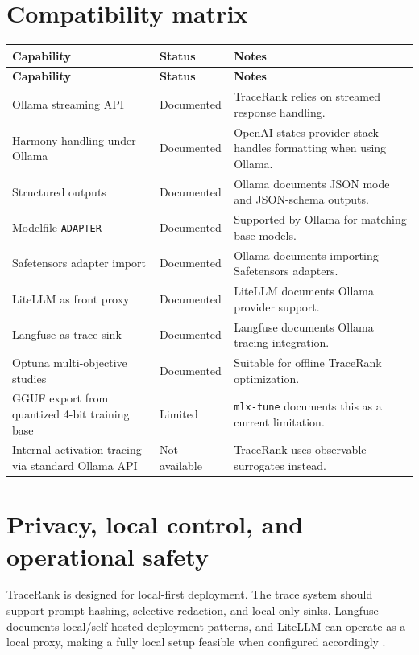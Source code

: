     \section{Compatibility matrix}
    \begin{longtable}{p{4cm}p{3cm}p{7.2cm}}
    \toprule
    \textbf{Capability} & \textbf{Status} & \textbf{Notes} \\
    \midrule
    \endfirsthead
    \toprule
    \textbf{Capability} & \textbf{Status} & \textbf{Notes} \\
    \midrule
    \endhead
    Ollama streaming API & Documented & TraceRank relies on streamed response handling. \\
    Harmony handling under Ollama & Documented & OpenAI states provider stack handles formatting when using Ollama. \\
    Structured outputs & Documented & Ollama documents JSON mode and JSON-schema outputs. \\
    Modelfile \texttt{ADAPTER} & Documented & Supported by Ollama for matching base models. \\
    Safetensors adapter import & Documented & Ollama documents importing Safetensors adapters. \\
    LiteLLM as front proxy & Documented & LiteLLM documents Ollama provider support. \\
    Langfuse as trace sink & Documented & Langfuse documents Ollama tracing integration. \\
    Optuna multi-objective studies & Documented & Suitable for offline TraceRank optimization. \\
    GGUF export from quantized 4-bit training base & Limited & \texttt{mlx-tune} documents this as a current limitation. \\
    Internal activation tracing via standard Ollama API & Not available & TraceRank uses observable surrogates instead. \\
    \bottomrule
    \end{longtable}
    
    \section{Privacy, local control, and operational safety}
    TraceRank is designed for local-first deployment. The trace system should support prompt hashing, selective redaction, and local-only sinks. Langfuse documents local/self-hosted deployment patterns, and LiteLLM can operate as a local proxy, making a fully local setup feasible when configured accordingly \cite{langfuse_ollama,litellm_ollama}.
    
